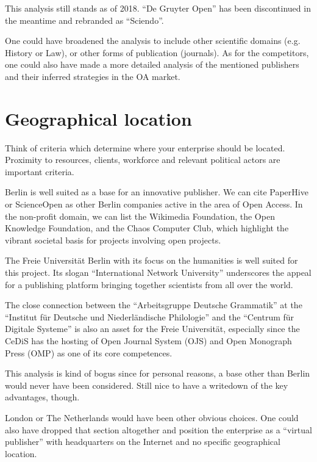 \documentclass[nonflat,smallfont
]{langsci/langscibook}
\newcommand{\background}[1]{ 
  \vspace{5mm}
  \renewcommand{\tblslinecolour}{lsDarkBlue}
  \tblssy[red]{explore2}{Background}{\vspace*{-5mm}#1}
}
\newcommand{\langscisolution}[1]{
  \renewcommand{\tblslinecolour}{lsLightBlue}
  \tblssy{langsci}{LangSci solution}{\vspace*{-5mm}#1}
}
\newcommand{\evaluation}[1]{
  \renewcommand{\tblslinecolour}{lsLightOrange}
  \tblssy{receipt}{Evaluation}{\vspace*{-5mm}#1}
}
\newcommand{\othersolutions}[1]{
  \renewcommand{\tblslinecolour}{lsDarkGreenOne}
  \tblssy{more}{Other solutions}{\vspace*{-5mm}#1}
}
\renewcommand{\tblssy}[4][black!12]{%
  \renewcommand{\langscisymbol}{#2}\renewcommand{\tblsboxcolor}{#1}
  \begin{mdframed}[style=yellowexercise,frametitle={#3}]
    #4
  \end{mdframed}
}
\begin{document}
\evaluation{This analysis still stands as of 2018. ``De Gruyter Open'' has been discontinued in the meantime and rebranded as ``Sciendo''. }
\largerpage
\othersolutions{One could have broadened the analysis to include other scientific domains (e.g. History or Law), or other forms of publication (journals). As for the competitors, one could also have made a more detailed analysis of the mentioned publishers and their inferred strategies in the OA market.}
 
\section{Geographical location}
\vspace*{5mm}
\background{Think of criteria which determine where your enterprise should be located. Proximity to resources, clients, workforce and relevant political actors are important criteria.}
\langscisolution{
Berlin is well suited as a base for an innovative publisher. We can cite PaperHive or ScienceOpen as other Berlin companies active in the area of Open Access. In the non-profit domain, we can list the Wikimedia Foundation, the Open Knowledge Foundation, and the Chaos Computer Club, which highlight the vibrant societal basis for projects involving open projects. 

The Freie Universität Berlin with its focus on the humanities is well suited for this project. Its slogan ``International Network University'' underscores the appeal for a publishing platform bringing together scientists from all over the world. 

The close connection between the ``Arbeitsgruppe Deutsche Grammatik'' at the ``Institut für Deutsche und Niederländische Philologie'' and the ``Centrum für Digitale Systeme'' is also an asset for the Freie Universität, especially since the CeDiS has the hosting of Open Journal System (OJS) and Open Monograph Press (OMP) as one of its core competences.
}
\evaluation{This analysis is kind of bogus since for personal reasons, a base other than Berlin would never have been considered. Still nice to have a writedown of the key advantages, though.}
\othersolutions{London or The Netherlands would have been other obvious choices. One could also have dropped that section altogether and position the enterprise as a ``virtual publisher'' with headquarters on the Internet and no specific geographical location.}
 
\end{document}
